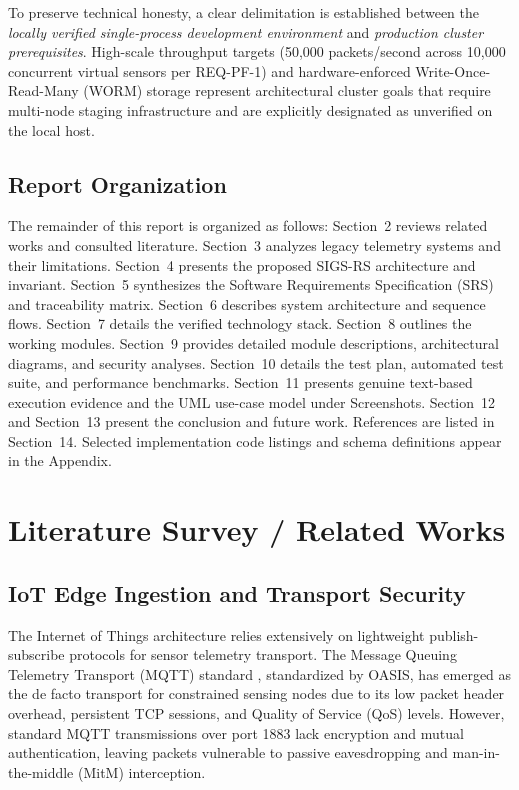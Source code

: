 \documentclass[a4paper]{article}
\begin{document}
To preserve technical honesty, a clear delimitation is established between the \emph{locally verified single-process development environment} and \emph{production cluster prerequisites}. High-scale throughput targets (50,000 packets/second across 10,000 concurrent virtual sensors per REQ-PF-1) and hardware-enforced Write-Once-Read-Many (WORM) storage represent architectural cluster goals that require multi-node staging infrastructure and are explicitly designated as unverified on the local host.

\subsection{Report Organization}
The remainder of this report is organized as follows: Section~2 reviews related works and consulted literature. Section~3 analyzes legacy telemetry systems and their limitations. Section~4 presents the proposed SIGS-RS architecture and invariant. Section~5 synthesizes the Software Requirements Specification (SRS) and traceability matrix. Section~6 describes system architecture and sequence flows. Section~7 details the verified technology stack. Section~8 outlines the working modules. Section~9 provides detailed module descriptions, architectural diagrams, and security analyses. Section~10 details the test plan, automated test suite, and performance benchmarks. Section~11 presents genuine text-based execution evidence and the UML use-case model under Screenshots. Section~12 and Section~13 present the conclusion and future work. References are listed in Section~14. Selected implementation code listings and schema definitions appear in the Appendix.

\section{Literature Survey / Related Works}

\subsection{IoT Edge Ingestion and Transport Security}
The Internet of Things architecture relies extensively on lightweight publish-subscribe protocols for sensor telemetry transport. The Message Queuing Telemetry Transport (MQTT) standard \cite{oasis_mqtt5}, standardized by OASIS, has emerged as the de facto transport for constrained sensing nodes due to its low packet header overhead, persistent TCP sessions, and Quality of Service (QoS) levels. However, standard MQTT transmissions over port 1883 lack encryption and mutual authentication, leaving packets vulnerable to passive eavesdropping and man-in-the-middle (MitM) interception.
\end{document}
